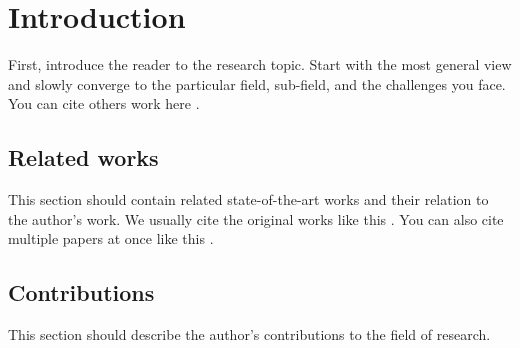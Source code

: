 
\chapter{Introduction\label{chap:introduction}}

First, introduce the reader to the research topic.
Start with the most general view and slowly converge to the particular field, sub-field, and the challenges you face.
You can cite others work here \cite{baca2020mrs}.

\section{Related works}

This section should contain related state-of-the-art works and their relation to the author's work.
We usually cite the original works like this \cite{benallegue2008high}.
You can also cite multiple papers at once like this \cite{baca2016embedded, baca2020mrs}.

\section{Contributions}

This section should describe the author's contributions to the field of research.
